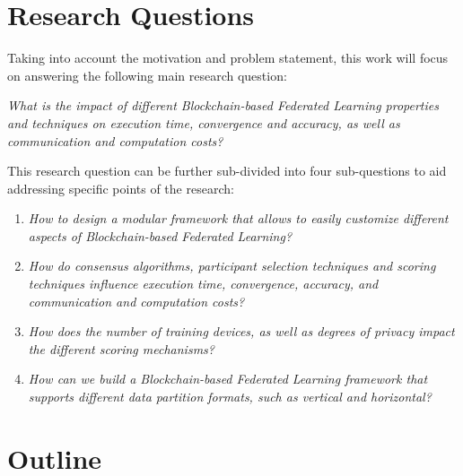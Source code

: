 \section{Research Questions}\label{intro:questions}

Taking into account the motivation and problem statement, this work will focus on answering the following main research question:

\begin{center}
    \textit{What is the impact of different Blockchain-based Federated Learning properties and techniques on execution time, convergence and accuracy, as well as communication and computation costs?}
\end{center}

This research question can be further sub-divided into four sub-questions to aid addressing specific points of the research:

\begin{enumerate}
    \item \textit{How to design a modular framework that allows to easily customize different aspects of Blockchain-based Federated Learning?}
    
    \item \textit{How do consensus algorithms, participant selection techniques and scoring techniques influence execution time, convergence, accuracy, and communication and computation costs?}
    
    \item \textit{How does the number of training devices, as well as degrees of privacy impact the different scoring mechanisms?}
    
    \item \textit{How can we build a Blockchain-based Federated Learning framework that supports different data partition formats, such as vertical and horizontal?}
\end{enumerate}

\section{Outline}\label{intro:outline}


